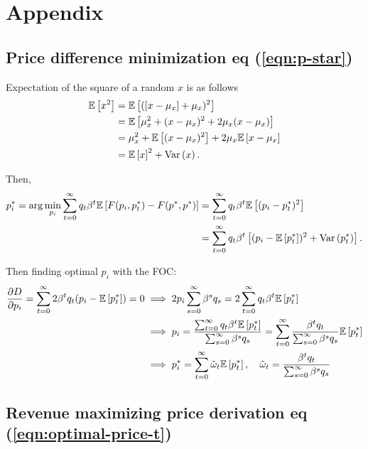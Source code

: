 \documentclass[../main.tex]{subfiles}
\begin{document}
    \newpage
    \section{Appendix}
        
    \subsection{Price difference minimization eq (\ref{eqn:p-star})}\label{calc:p-star}
        Expectation of the square of a random $x$ is as follows
        \begin{align}
            \mathbb{E}\left[x^2\right]
            &= \mathbb{E}\left[([x - \mu_x] + \mu_x)^2\right]
            \\
            &= \mathbb{E}\left[\mu_x^2 + (x - \mu_x)^2 + 2\mu_x(x - \mu_x)\right]
            \\
            &= \mu_x^2 + \mathbb{E}\left[(x - \mu_x)^2\right] + 2\mu_x\mathbb{E}\left[x - \mu_x\right]
            \\
            &= \mathbb{E}\left[x\right]^2 + \mathrm{Var}\left(x\right).
        \end{align}
    
        Then,
        \begin{align}
            p_i^*
            = \arg\min_{p_i} \sum_{t=0}^\infty q_t \beta^t \mathbb{E}\left[F(p_i, p_t^*) - F(p^*, p^*)\right]
            &=\sum_{t=0}^\infty q_t \beta^t \mathbb{E}\left[(p_i - p_t^*)^2\right]
            \\
            &= \sum_{t=0}^\infty q_t \beta^t \left[(p_i - \mathbb{E}\left[p_t^*\right])^2 + \mathrm{Var}\left(p_t^*\right)\right].
        \end{align}
        
        Then finding optimal $p_i$ with the FOC:
        \begin{align}
            \frac{\partial D}{\partial p_i}
            = \sum_{t=0}^\infty 2 \beta^t q_t (p_i - \mathbb{E}\left[p_t^*\right])
            = 0
            &\implies
            2p_i \sum_{s=0}^\infty \beta^s q_s = 2\sum_{t=0}^\infty q_t \beta^t \mathbb{E}\left[p_t^*\right]
            \\
            &\implies
            p_i = \frac{\sum_{t=0}^\infty q_t \beta^t \mathbb{E}\left[p_t^*\right]}{\sum_{s=0}^\infty \beta^s q_s}
            = \sum_{t=0}^\infty \frac{\beta^t q_t}{\sum_{s=0}^\infty \beta^s q_s} \mathbb{E}\left[p_t^*\right]
            \\
            &\implies
            p_i^* = \sum_{t=0}^\infty \tilde\omega_t \mathbb{E}\left[p_t^*\right], \quad \tilde\omega_t = \frac{\beta^t q_t}{\sum_{s=0}^\infty \beta^s q_s}
        \end{align}
        
    \subsection{Revenue maximizing price derivation eq (\ref{eqn:optimal-price-t})}
        \label{calc:optimal-price-t}
        
\end{document}
